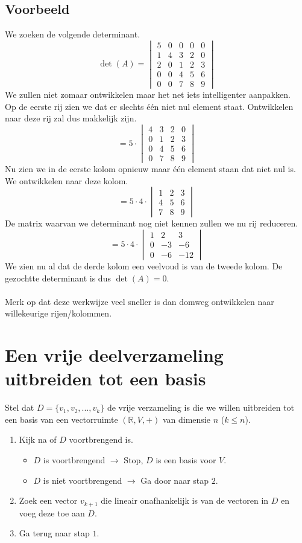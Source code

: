 \documentclass[lineaire_algebra_oplossingen.tex]{subfiles}
\begin{document}
\subsection*{Voorbeeld}
We zoeken de volgende determinant.
\[
\det(A) =
\begin{vmatrix}
5 & 0 & 0 & 0 & 0\\
1 & 4 & 3 & 2 & 0\\
2 & 0 & 1 & 2 & 3\\
0 & 0 & 4 & 5 & 6\\
0 & 0 & 7 & 8 & 9
\end{vmatrix}
\]
We zullen niet zomaar ontwikkelen maar het net iets intelligenter aanpakken.\\
Op de eerste rij zien we dat er slechts \'e\'en niet nul element staat. Ontwikkelen naar deze rij zal dus makkelijk zijn.
\[
=
5
\cdot
\begin{vmatrix}
4 & 3 & 2 & 0\\
0 & 1 & 2 & 3\\
0 & 4 & 5 & 6\\
0 & 7 & 8 & 9
\end{vmatrix}
\]
Nu zien we in de eerste kolom opnieuw maar \'e\'en element staan dat niet nul is. We ontwikkelen naar deze kolom.
\[
=
5
\cdot
4
\cdot
\begin{vmatrix}
1 & 2 & 3\\
4 & 5 & 6\\
7 & 8 & 9
\end{vmatrix}
\]
De matrix waarvan we determinant nog niet kennen zullen we nu rij reduceren.
\[
=
5
\cdot
4
\cdot
\begin{vmatrix}
1 & 2 & 3\\
0 & -3 & -6\\
0 & -6 & -12
\end{vmatrix}
\]
We zien nu al dat de derde kolom een veelvoud is van de tweede kolom.
De gezochtte determinant is dus $\det(A) = 0$.\\\\
Merk op dat deze werkwijze veel sneller is dan domweg ontwikkelen naar willekeurige rijen/kolommen.

\section{Een vrije deelverzameling uitbreiden tot een basis}
Stel dat $D = \{v_1,v_2,...,v_k\}$ de vrije verzameling is die we willen uitbreiden tot een basis van een vectorruimte $(\mathbb{R},V,+)$ van dimensie $n$ ($k\le n$).
\begin{enumerate}
\item Kijk na of $D$ voortbrengend is.
\begin{itemize}
\item $D$ is voortbrengend $\rightarrow$ Stop, $D$ is een  basis voor $V$.
\item $D$ is niet voortbrengend $\rightarrow$ Ga door naar stap $2$.
\end{itemize}
\item Zoek een vector $v_{k+1}$ die lineair onafhankelijk is van de vectoren in $D$ en voeg deze toe aan $D$.
\item Ga terug naar stap $1$.
\end{enumerate}
\end{document}
